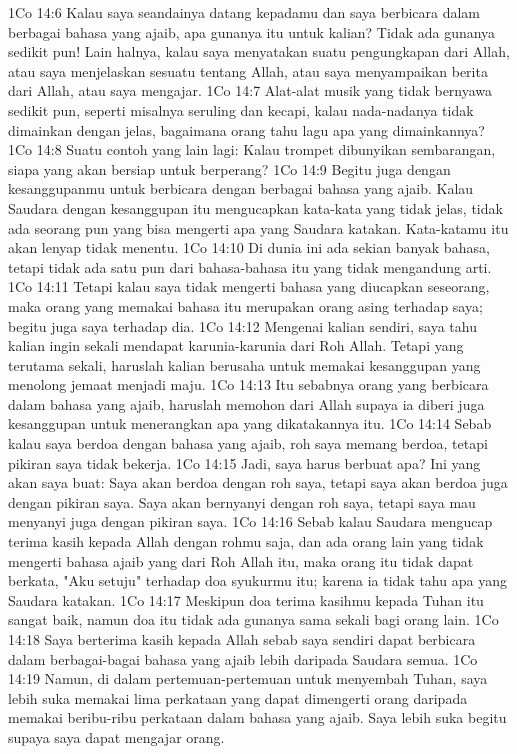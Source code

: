 1Co 14:6  Kalau saya seandainya datang kepadamu dan saya berbicara dalam berbagai bahasa yang ajaib, apa gunanya itu untuk kalian? Tidak ada gunanya sedikit pun! Lain halnya, kalau saya menyatakan suatu pengungkapan dari Allah, atau saya menjelaskan sesuatu tentang Allah, atau saya menyampaikan berita dari Allah, atau saya mengajar.
1Co 14:7  Alat-alat musik yang tidak bernyawa sedikit pun, seperti misalnya seruling dan kecapi, kalau nada-nadanya tidak dimainkan dengan jelas, bagaimana orang tahu lagu apa yang dimainkannya?
1Co 14:8  Suatu contoh yang lain lagi: Kalau trompet dibunyikan sembarangan, siapa yang akan bersiap untuk berperang?
1Co 14:9  Begitu juga dengan kesanggupanmu untuk berbicara dengan berbagai bahasa yang ajaib. Kalau Saudara dengan kesanggupan itu mengucapkan kata-kata yang tidak jelas, tidak ada seorang pun yang bisa mengerti apa yang Saudara katakan. Kata-katamu itu akan lenyap tidak menentu.
1Co 14:10  Di dunia ini ada sekian banyak bahasa, tetapi tidak ada satu pun dari bahasa-bahasa itu yang tidak mengandung arti.
1Co 14:11  Tetapi kalau saya tidak mengerti bahasa yang diucapkan seseorang, maka orang yang memakai bahasa itu merupakan orang asing terhadap saya; begitu juga saya terhadap dia.
1Co 14:12  Mengenai kalian sendiri, saya tahu kalian ingin sekali mendapat karunia-karunia dari Roh Allah. Tetapi yang terutama sekali, haruslah kalian berusaha untuk memakai kesanggupan yang menolong jemaat menjadi maju.
1Co 14:13  Itu sebabnya orang yang berbicara dalam bahasa yang ajaib, haruslah memohon dari Allah supaya ia diberi juga kesanggupan untuk menerangkan apa yang dikatakannya itu.
1Co 14:14  Sebab kalau saya berdoa dengan bahasa yang ajaib, roh saya memang berdoa, tetapi pikiran saya tidak bekerja.
1Co 14:15  Jadi, saya harus berbuat apa? Ini yang akan saya buat: Saya akan berdoa dengan roh saya, tetapi saya akan berdoa juga dengan pikiran saya. Saya akan bernyanyi dengan roh saya, tetapi saya mau menyanyi juga dengan pikiran saya.
1Co 14:16  Sebab kalau Saudara mengucap terima kasih kepada Allah dengan rohmu saja, dan ada orang lain yang tidak mengerti bahasa ajaib yang dari Roh Allah itu, maka orang itu tidak dapat berkata, "Aku setuju" terhadap doa syukurmu itu; karena ia tidak tahu apa yang Saudara katakan.
1Co 14:17  Meskipun doa terima kasihmu kepada Tuhan itu sangat baik, namun doa itu tidak ada gunanya sama sekali bagi orang lain.
1Co 14:18  Saya berterima kasih kepada Allah sebab saya sendiri dapat berbicara dalam berbagai-bagai bahasa yang ajaib lebih daripada Saudara semua.
1Co 14:19  Namun, di dalam pertemuan-pertemuan untuk menyembah Tuhan, saya lebih suka memakai lima perkataan yang dapat dimengerti orang daripada memakai beribu-ribu perkataan dalam bahasa yang ajaib. Saya lebih suka begitu supaya saya dapat mengajar orang.
